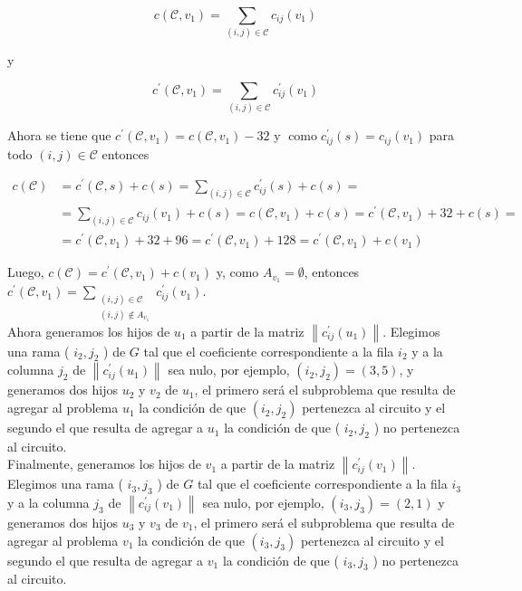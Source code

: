 \documentclass[10pt]{article}
\begin{document}
$$
c\left(\mathcal{C}, v_{1}\right)=\sum_{(i, j) \in \mathcal{C}} c_{i j}\left(v_{1}\right)
$$

y

$$
c^{\prime}\left(\mathcal{C}, v_{1}\right)=\sum_{(i, j) \in \mathcal{C}} c_{i j}^{\prime}\left(v_{1}\right)
$$

Ahora se tiene que $c^{\prime}\left(\mathcal{C}, v_{1}\right)=c\left(\mathcal{C}, v_{1}\right)-32$ y $\operatorname{como} c_{i j}^{\prime}(s)=c_{i j}\left(v_{1}\right)$ para todo $(i, j) \in \mathcal{C}$ entonces

$$
\begin{aligned}
c(\mathcal{C}) & =c^{\prime}(\mathcal{C}, s)+c(s)=\sum_{(i, j) \in \mathcal{C}} c_{i j}^{\prime}(s)+c(s)= \\
& =\sum_{(i, j) \in \mathcal{C}} c_{i j}\left(v_{1}\right)+c(s)=c\left(\mathcal{C}, v_{1}\right)+c(s)=c^{\prime}\left(\mathcal{C}, v_{1}\right)+32+c(s)= \\
& =c^{\prime}\left(\mathcal{C}, v_{1}\right)+32+96=c^{\prime}\left(\mathcal{C}, v_{1}\right)+128=c^{\prime}\left(\mathcal{C}, v_{1}\right)+c\left(v_{1}\right)
\end{aligned}
$$

Luego, $c(\mathcal{C})=c^{\prime}\left(\mathcal{C}, v_{1}\right)+c\left(v_{1}\right)$ y, como $A_{v_{1}}=\emptyset$, entonces $c^{\prime}\left(\mathcal{C}, v_{1}\right)=\sum_{\substack{(i, j) \in \mathcal{C} \\(i, j) \notin A_{v_{1}}}} c_{i j}^{\prime}\left(v_{1}\right)$.\\
Ahora generamos los hijos de $u_{1}$ a partir de la matriz $\left\|c_{i j}^{\prime}\left(u_{1}\right)\right\|$. Elegimos una rama ( $i_{2}, j_{2}$ ) de $G$ tal que el coeficiente correspondiente a la fila $i_{2}$ y a la columna $j_{2}$ de $\left\|c_{i j}^{\prime}\left(u_{1}\right)\right\|$ sea nulo, por ejemplo, $\left(i_{2}, j_{2}\right)=(3,5)$, y generamos dos hijos $u_{2}$ y $v_{2}$ de $u_{1}$, el primero será el subproblema que resulta de agregar al problema $u_{1}$ la condición de que $\left(i_{2}, j_{2}\right)$ pertenezca al circuito y el segundo el que resulta de agregar a $u_{1}$ la condición de que ( $i_{2}, j_{2}$ ) no pertenezca al circuito.\\
Finalmente, generamos los hijos de $v_{1}$ a partir de la matriz $\left\|c_{i j}^{\prime}\left(v_{1}\right)\right\|$. Elegimos una rama ( $i_{3}, j_{3}$ ) de $G$ tal que el coeficiente correspondiente a la fila $i_{3}$ y a la columna $j_{3}$ de $\left\|c_{i j}^{\prime}\left(v_{1}\right)\right\|$ sea nulo, por ejemplo, $\left(i_{3}, j_{3}\right)=(2,1)$ y generamos dos hijos $u_{3}$ y $v_{3}$ de $v_{1}$, el primero será el subproblema que resulta de agregar al problema $v_{1}$ la condición de que $\left(i_{3}, j_{3}\right)$ pertenezca al circuito y el segundo el que resulta de agregar a $v_{1}$ la condición de que ( $i_{3}, j_{3}$ ) no pertenezca al circuito.
\end{document}
